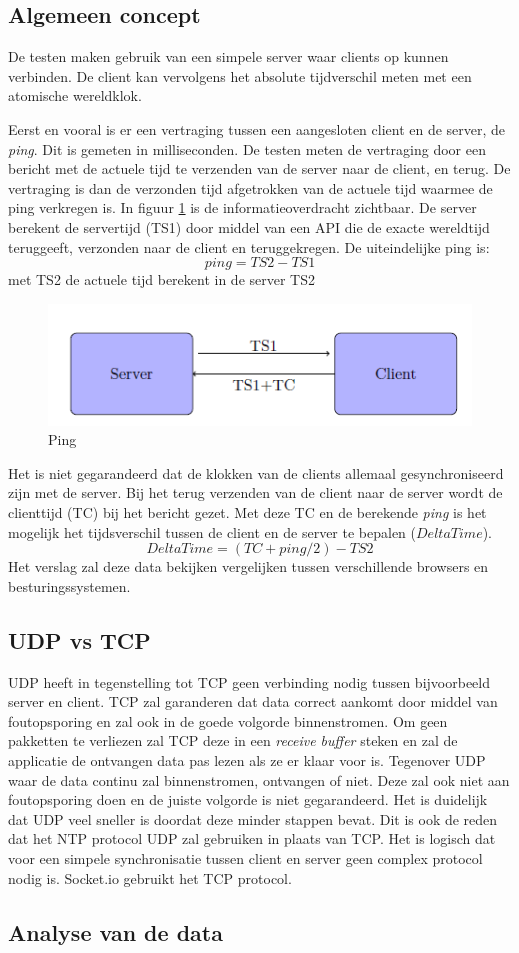 \subsection{Algemeen concept}
De testen maken gebruik van een simpele server waar clients op kunnen verbinden. De client kan vervolgens het absolute tijdverschil meten met een atomische wereldklok.

Eerst en vooral is er een vertraging tussen een aangesloten client en de server, de {\it ping}. Dit is gemeten in milliseconden. De testen meten de vertraging door een bericht met de actuele tijd te verzenden van de server naar de client, en terug. De vertraging is dan de verzonden tijd afgetrokken van de actuele tijd waarmee de ping verkregen is.
In figuur \ref{diag} is de informatieoverdracht zichtbaar. De server berekent de servertijd (TS1) door middel van een API die de exacte wereldtijd teruggeeft, verzonden naar de client en teruggekregen. De uiteindelijke ping is: \[ping = TS2 - TS1\] met TS2 de actuele tijd berekent in de server TS2

\begin{figure}
\centering
\includegraphics[scale=0.8]{img/img.png}
\caption{Ping} \label{diag}
\end{figure}


Het is niet gegarandeerd dat de klokken van de clients allemaal gesynchroniseerd zijn met de server. Bij het terug verzenden van de client naar de server wordt de clienttijd (TC) bij het bericht gezet.  Met deze TC en de berekende {\it ping} is het mogelijk het tijdsverschil tussen de client en de server te bepalen ($DeltaTime$).
\[DeltaTime = (TC+ping/2) - TS2\]
Het verslag zal deze data bekijken vergelijken tussen verschillende browsers en besturingssystemen.

\subsection{UDP vs TCP}

UDP heeft in tegenstelling tot TCP geen verbinding nodig tussen bijvoorbeeld server en client. TCP zal garanderen dat data correct aankomt door middel van foutopsporing en zal ook in de goede volgorde binnenstromen. Om geen pakketten te verliezen zal TCP deze in een {\it receive buffer} steken en zal de applicatie de ontvangen data pas lezen als ze er klaar voor is. Tegenover UDP waar de data continu zal binnenstromen, ontvangen of niet. Deze zal ook niet aan foutopsporing doen en de juiste volgorde is niet gegarandeerd. Het is duidelijk dat UDP veel sneller is doordat deze minder stappen bevat. Dit is ook de reden dat het NTP protocol UDP zal gebruiken in plaats van TCP. Het is logisch dat voor een simpele synchronisatie tussen client en server geen complex protocol nodig is. Socket.io gebruikt het TCP protocol.



\subsection{Analyse van de data}